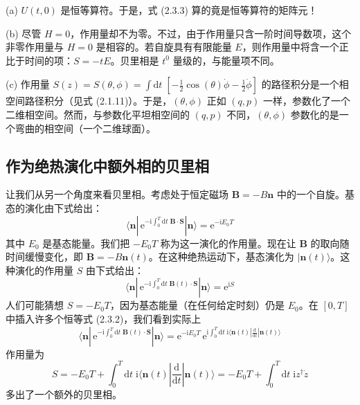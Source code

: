 (a) $U(t,0)$ 是恒等算符。于是，式 (2.3.3) 算的竟是恒等算符的矩阵元！

(b) 尽管 $H = 0$，作用量却不为零。不过，由于作用量只含一阶时间导数项，这个非零作用量与 $H = 0$ 是相容的。若自旋具有有限能量 $E$，则作用量中将含一个正比于时间的项：$S = -tE$。贝里相是 $t^0$ 量级的，与能量项不同。

(c) 作用量 $S(z) = S(\theta, \phi) = \int \mathrm{d}t\; [-\frac{1}{2}\cos(\theta)\dot{\phi} - \frac{1}{2}\dot{\phi}]$ 的路径积分是一个相空间路径积分（见式 (2.1.11)）。于是，$(\theta, \phi)$ 正如 $(q, p)$ 一样，参数化了一个二维相空间。然而，与参数化平坦相空间的 $(q, p)$ 不同，$(\theta, \phi)$ 参数化的是一个弯曲的相空间（一个二维球面）。

\subsection{作为绝热演化中额外相的贝里相}

让我们从另一个角度来看贝里相。考虑处于恒定磁场 $\pmb{B} = -B\pmb{n}$ 中的一个自旋。基态的演化由下式给出：
\begin{equation*}
\langle\pmb{n}|\,\mathrm{e}^{-\mathrm{i}\int_0^T \mathrm{d}t\; \pmb{B}\cdot\pmb{S}}|\pmb{n}\rangle = \mathrm{e}^{-\mathrm{i}E_0 T}
\end{equation*}
其中 $E_0$ 是基态能量。我们把 $-E_0 T$ 称为这一演化的作用量。现在让 $\pmb{B}$ 的取向随时间缓慢变化，即 $\pmb{B} = -B\pmb{n}(t)$。在这种绝热运动下，基态演化为 $|\pmb{n}(t)\rangle$。这种演化的作用量 $S$ 由下式给出：
\begin{equation*}
\langle\pmb{n}|\,\mathrm{e}^{-\mathrm{i}\int_0^T \mathrm{d}t\; \pmb{B}(t)\cdot\pmb{S}}|\pmb{n}\rangle = \mathrm{e}^{\mathrm{i}S}
\end{equation*}
人们可能猜想 $S = -E_0 T$，因为基态能量（在任何给定时刻）仍是 $E_0$。在 $[0, T]$ 中插入许多个恒等式 (2.3.2)，我们看到实际上
\begin{equation*}
\langle\pmb{n}|\,\mathrm{e}^{-\mathrm{i}\int_0^T \mathrm{d}t\; \pmb{B}(t)\cdot\pmb{S}}|\pmb{n}\rangle = \mathrm{e}^{-\mathrm{i}E_0 T}\, \mathrm{e}^{\mathrm{i}\int_0^T \mathrm{d}t\; \mathrm{i}\langle\pmb{n}(t)|\frac{\mathrm{d}}{\mathrm{d}t}|\pmb{n}(t)\rangle}
\end{equation*}
作用量为
\begin{equation*}
S = -E_0 T + \int_0^T \mathrm{d}t\; \mathrm{i}\langle\pmb{n}(t)|\frac{\mathrm{d}}{\mathrm{d}t}|\pmb{n}(t)\rangle = -E_0 T + \int_0^T \mathrm{d}t\; \mathrm{i}z^{\dagger}\dot{z} \tag{2.3.4}
\end{equation*}
多出了一个额外的贝里相。

